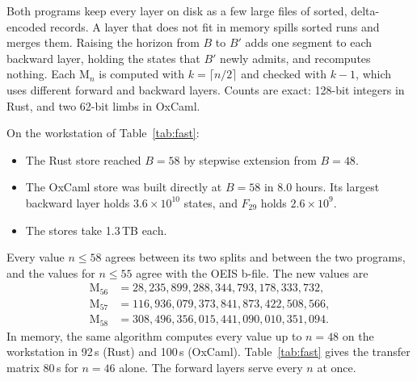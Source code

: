 \documentclass[11pt]{amsart}
\theoremstyle{definition}
\theoremstyle{remark}
\newcommand{\Open}{\mathrm{M}}
\begin{document}
Both programs keep every layer on disk as a few large files of sorted, delta-encoded records.
A layer that does not fit in memory spills sorted runs and merges them. Raising the horizon
from $B$ to $B'$ adds one segment to each backward layer, holding the states that $B'$ newly
admits, and recomputes nothing. Each $\Open_n$ is computed with $k = \lceil n/2 \rceil$ and
checked with $k - 1$, which uses different forward and backward layers. Counts are exact:
128-bit integers in Rust, and two 62-bit limbs in OxCaml.

On the workstation of Table~\ref{tab:fast}:
\begin{itemize}
  \item The Rust store reached $B = 58$ by stepwise extension from $B = 48$.
  \item The OxCaml store was built directly at $B = 58$ in 8.0 hours. Its largest backward
    layer holds $3.6 \times 10^{10}$ states, and $F_{29}$ holds $2.6 \times 10^9$.
  \item The stores take 1.3\,TB each.
\end{itemize}

Every value $n \le 58$ agrees between its two splits and between the two programs, and the
values for $n \le 55$ agree with the OEIS b-file. The new values are
\[
  \begin{aligned}
    \Open_{56} &= 28{,}235{,}899{,}288{,}344{,}793{,}178{,}333{,}732,\\
    \Open_{57} &= 116{,}936{,}079{,}373{,}841{,}873{,}422{,}508{,}566,\\
    \Open_{58} &= 308{,}496{,}356{,}015{,}441{,}090{,}010{,}351{,}094.
  \end{aligned}
\]
In memory, the same algorithm computes every value up to $n = 48$ on the workstation in 92\,s
(Rust) and 100\,s (OxCaml). Table~\ref{tab:fast} gives the transfer matrix 80\,s for $n = 46$
alone. The forward layers serve every $n$ at once.
\end{document}
